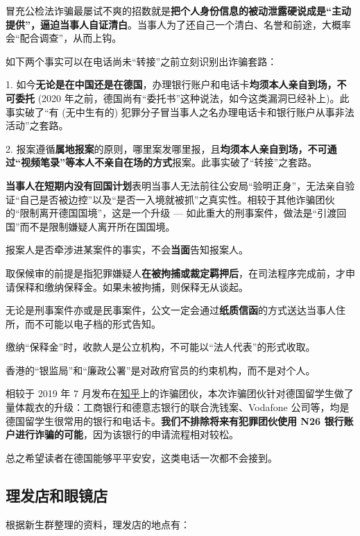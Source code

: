     冒充公检法诈骗最屡试不爽的招数就是\textbf{把个人身份信息的被动泄露硬说成是``主动提供''，逼迫当事人自证清白}。当事人为了还自己一个清白、名誉和前途，大概率会``配合调查''，从而上钩。

    如下两个事实可以在电话尚未``转接''之前立刻识别出诈骗套路：

    1. 如今\textbf{无论是在中国还是在德国}，办理银行账户和电话卡\textbf{均须本人亲自到场，不可委托} (2020 年之前，德国尚有``委托书''这种说法，如今这类漏洞已经补上)。此事实破了``有 (无中生有的) 犯罪分子冒当事人之名办理电话卡和银行账户从事非法活动''之套路。

    2. 报案遵循\textbf{属地报案}的原则，哪里案发哪里报，且\textbf{均须本人亲自到场，不可通过``视频笔录''等本人不亲自在场的方式}报案。此事实破了``转接''之套路。

    \textbf{当事人在短期内没有回国计划}表明当事人无法前往公安局``验明正身''，无法亲自验证``自己是否被边控''以及``是否一入境就被抓''之真实性。相较于其他诈骗团伙的``限制离开德国国境''，这是一个升级 --- 如此重大的刑事案件，做法是``引渡回国''而不是限制嫌疑人离开所在国国境。

    报案人是否牵涉进某案件的事实，不会\textbf{当面}告知报案人。

    取保候审的前提是指犯罪嫌疑人\textbf{在被拘捕或裁定羁押后}，在司法程序完成前，才申请保释和缴纳保释金。如果未被拘捕，则保释无从谈起。

    无论是刑事案件亦或是民事案件，公文一定会通过\textbf{纸质信函}的方式送达当事人住所，而不可能以电子档的形式告知。

    缴纳``保释金''时，收款人是公立机构，不可能以``法人代表''的形式收取。

    香港的``银监局''和``廉政公署''是对政府官员的约束机构，而不是对个人。

    相较于 2019 年 7 月发布在\href{https://zhuanlan.zhihu.com/p/73981290}{知乎}上的诈骗团伙，本次诈骗团伙针对德国留学生做了量体裁衣的升级：工商银行和德意志银行的联合洗钱案、Vodafone 公司等，均是德国留学生很常用的银行和电话卡。\textbf{我们不排除将来有犯罪团伙使用 N26 银行账户进行诈骗的可能}，因为该银行的申请流程相对较松。

    总之希望读者在德国能够平平安安，这类电话一次都不会接到。

  \subsection{理发店和眼镜店}\label{subsec:理发店和眼镜店}

    根据新生群整理的资料，理发店的地点有：

